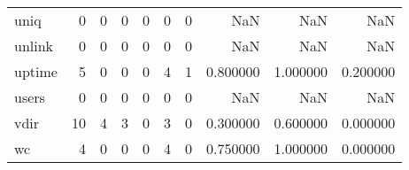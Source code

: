 \begin{longtable}{lrrrrrrrrr}
uniq      &                                                  0 &                                                  0 &                                                  0 &                                                  0 &                                                  0 &                                                  0 &                                                NaN &                                    NaN &                                  NaN \\
unlink    &                                                  0 &                                                  0 &                                                  0 &                                                  0 &                                                  0 &                                                  0 &                                                NaN &                                    NaN &                                  NaN \\
uptime    &                                                  5 &                                                  0 &                                                  0 &                                                  0 &                                                  4 &                                                  1 &                                           0.800000 &                               1.000000 &                             0.200000 \\
users     &                                                  0 &                                                  0 &                                                  0 &                                                  0 &                                                  0 &                                                  0 &                                                NaN &                                    NaN &                                  NaN \\
vdir      &                                                 10 &                                                  4 &                                                  3 &                                                  0 &                                                  3 &                                                  0 &                                           0.300000 &                               0.600000 &                             0.000000 \\
wc        &                                                  4 &                                                  0 &                                                  0 &                                                  0 &                                                  4 &                                                  0 &                                           0.750000 &                               1.000000 &                             0.000000 \\

\end{longtable}
